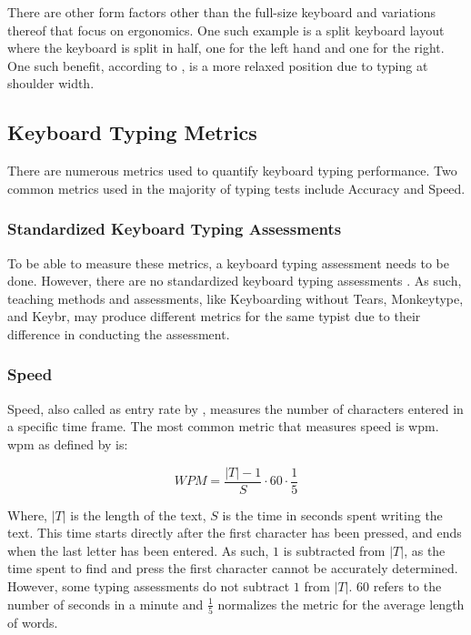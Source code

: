 \documentclass{report}
\begin{document}
There are other form factors other than the full-size keyboard and variations
thereof that focus on ergonomics. One such example is a split keyboard layout
where the keyboard is split in half, one for the left hand and one for the
right. One such benefit, according to \citeauthor{ergodox}, is a more relaxed
position due to typing at shoulder width.

\subsection{Keyboard Typing Metrics}

There are numerous metrics used to quantify keyboard typing performance. Two
common metrics used in the majority of typing tests include Accuracy and Speed.

\subsubsection{Standardized Keyboard Typing Assessments}

To be able to measure these metrics, a keyboard typing assessment needs to be
done. However, there are no standardized keyboard typing assessments
\parencite{donica2018}. As such, teaching methods and assessments, like
Keyboarding without Tears, Monkeytype, and Keybr, may produce different metrics
for the same typist due to their difference in conducting the assessment.

\subsubsection{Speed}
Speed, also called as entry rate by \citeauthor{arif2009}, measures the number
of characters entered in a specific time frame. The most common metric that
measures speed is \ac{wpm}. \ac{wpm} as defined by \citeauthor{arif2009} is:

\begin{equation}
	WPM = \frac{|T| - 1}{S} \cdot 60 \cdot \frac{1}{5}
\end{equation}

Where, $|T|$ is the length of the text, $S$ is the time in seconds spent writing
the text. This time starts directly after the first character has been pressed,
and ends when the last letter has been entered. As such, $1$ is subtracted from
$|T|$, as the time spent to find and press the first character cannot be
accurately determined. However, some typing assessments do not subtract $1$ from
$|T|$. $60$ refers to the number of seconds in a minute and $\frac{1}{5}$
normalizes the metric for the average length of words.
\end{document}
